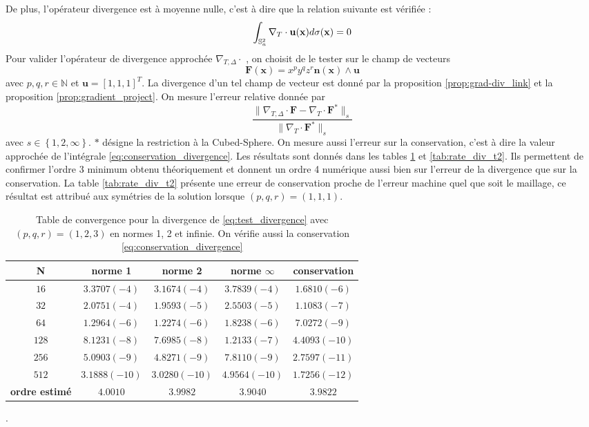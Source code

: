 De plus, l'opérateur divergence est à moyenne nulle, c'est à dire que la relation suivante est vérifiée :
\begin{equation}
\displaystyle\int_{\mathbb{S}_a^2} \nabla_T \cdot \mathbf{u} ( \mathbf{x} ) d \sigma ( \mathbf{x} ) = 0
\label{eq:conservation_divergence}
\end{equation}
Pour valider l'opérateur de divergence approchée $\nabla_{T, \Delta} \cdot$ , on choisit de le tester sur le champ de vecteurs 
\begin{equation}
\mathbf{F}(\mathbf{x}) = x^p y^q z^r \mathbf{n}(\mathbf{x}) \wedge \mathbf{u}
\label{eq:test_divergence}
\end{equation}
avec $p,q,r \in \mathbb{N}$ et $\mathbf{u} = [1, 1, 1]^T$. La divergence d'un tel champ de vecteur est donné par la proposition \ref{prop:grad-div_link} et la proposition \ref{prop:gradient_project}. 
On mesure l'erreur relative donnée par 
\begin{equation}
\dfrac{\| \nabla_{T,\Delta} \cdot \mathbf{F} - \nabla_{T} \cdot \mathbf{F}^* \|_s}{\| \nabla_{T} \cdot \mathbf{F}^* \|_s}
\end{equation}
avec $s \in \left\lbrace 1, 2, \infty \right\rbrace$. $*$ désigne la restriction à la Cubed-Sphere.
On mesure aussi l'erreur sur la conservation, c'est à dire la valeur approchée de l'intégrale \ref{eq:conservation_divergence}. Les résultats sont donnés dans les tables \ref{tab:rate_div} et \ref{tab:rate_div_t2}. Ils permettent de confirmer l'ordre 3 minimum obtenu théoriquement et donnent un ordre 4 numérique aussi bien sur l'erreur de la divergence que sur la conservation. La table \ref{tab:rate_div_t2} présente une erreur de conservation proche de l'erreur machine quel que soit le maillage, ce résultat est attribué aux symétries de la solution lorsque $(p,q,r)=(1,1,1)$.
\begin{table}[htbp]
\begin{center}
\begin{tabular}{|c||c|c|c||c|}
\hline
\textbf{N}  & \textbf{norme 1} & \textbf{norme 2} & \textbf{norme $\infty$} & \textbf{conservation}  \\
\hline
\hline
$16$ & $3.3707 (-4)$ & $3.1674 (-4)$ & $3.7839 (-4)$  & $1.6810 (-6)$ \\
$32$ & $2.0751 (-4)$ & $1.9593 (-5)$ & $2.5503 (-5)$  & $1.1083 (-7)$ \\
$64$ & $1.2964 (-6)$ & $1.2274 (-6)$ & $1.8238 (-6)$  & $7.0272 (-9)$ \\
$128$& $8.1231 (-8)$ & $7.6985 (-8)$ & $1.2133 (-7)$  & $4.4093 (-10)$\\
$256$& $5.0903 (-9)$ & $4.8271 (-9)$ & $7.8110 (-9)$  & $2.7597 (-11)$\\
$512$& $3.1888(-10)$ & $3.0280(-10)$ & $4.9564(-10)$  & $1.7256 (-12)$\\
\hline 
\hline
\textbf{ordre estimé}& $4.0010$ & $3.9982$ & $3.9040$ & $3.9822$ \\
\hline
\end{tabular}
\end{center}
\caption{Table de convergence pour la divergence de \eqref{eq:test_divergence} avec $(p,q,r)=(1,2,3)$ en normes 1, 2 et infinie. On vérifie aussi la conservation \eqref{eq:conservation_divergence}}.
\label{tab:rate_div}
\end{table}
